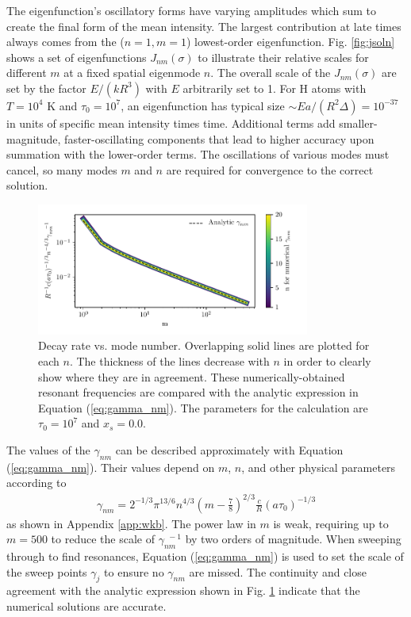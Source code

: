 \documentclass[linenumbers]{aastex63}
\newcommand{\be}{\begin{eqnarray}}
\newcommand{\ee}{\end{eqnarray}}
\begin{document}
The eigenfunction's oscillatory forms have varying amplitudes which sum to create the final form of the mean intensity. The largest contribution at late times always comes from the ($n=1, m=1$) lowest-order eigenfunction. Fig. \ref{fig:jsoln} shows a set of eigenfunctions $J_{nm}(\sigma)$ to illustrate their relative scales for different $m$ at a fixed spatial eigenmode $n$. The overall scale of the $J_{nm}(\sigma)$ are set by the factor $E/(kR^3)$ with $E$ arbitrarily set to 1. For H atoms with $T=10^4$ K and $\tau_0=10^7$, an eigenfunction has typical size ${\sim} E a / \left(R^2 \Delta \right) = 10^{-37}$ in units of specific mean intensity times time. Additional terms add smaller-magnitude, faster-oscillating components that lead to higher accuracy upon summation with the lower-order terms. The oscillations of various modes must cancel, so many modes $m$ and $n$ are required for convergence to the correct solution. 
\begin{figure}
    \centering
    \includegraphics[width=0.8\textwidth]{gamma_nm.pdf}
    \caption{Decay rate vs. mode number. Overlapping solid lines are plotted for each $n$. The thickness of the lines decrease with $n$ in order to clearly show where they are in agreement. These numerically-obtained resonant frequencies are compared with the analytic expression in Equation (\ref{eq:gamma_nm}). The parameters for the calculation are $\tau_0=10^7$ and $x_s=0.0$.}
    \label{fig:gamma_nm}
\end{figure}
The values of the $\gamma_{nm}$ can be described approximately with Equation (\ref{eq:gamma_nm}). Their values depend on $m$, $n$, and other physical parameters according to 
\be \label{eq:gamma_nm}
\gamma_{nm} = 2^{-1/3} \pi^{13/6} n^{4/3}\left(m-\frac{7}{8}\right)^{2/3}\frac{c}{R}(a\tau_0)^{-1/3}
\ee
as shown in Appendix \ref{app:wkb}. The power law in $m$ is weak, requiring up to $m=500$ to reduce the scale of $\gamma_{nm}^{\ \ -1}$ by two orders of magnitude. When sweeping through to find resonances, Equation (\ref{eq:gamma_nm}) is used to set the scale of the sweep points $\gamma_j$ to ensure no $\gamma_{nm}$ are missed. The continuity and close agreement with the analytic expression shown in Fig. \ref{fig:gamma_nm} indicate that the numerical solutions are accurate.
\end{document}
